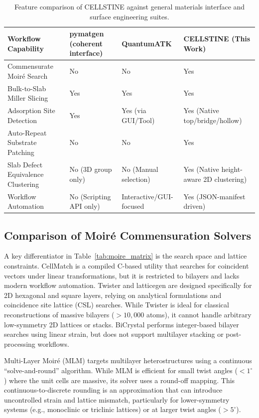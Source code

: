\documentclass[9pt,a4paper,twoside]{tau-class/tau}
\begin{document}
\begin{table}[!t]
    \centering
    \caption{Feature comparison of CELLSTINE against general materials interface and surface engineering suites.}
    \label{tab:interface_matrix}
    \small
    \begin{tabularx}{\textwidth}{@{}lXXX@{}}
        \toprule
        \textbf{Workflow Capability} & \textbf{pymatgen} (coherent interface) \cite{pymatgen,zur1984systematic} & \textbf{QuantumATK} \cite{quantumatk} & \textbf{CELLSTINE} (This Work) \\
        \midrule
        Commensurate Moir\'e Search & No & No & Yes \\
        Bulk-to-Slab Miller Slicing & Yes & Yes & Yes \\
        Adsorption Site Detection & Yes & Yes (via GUI/Tool) & Yes (Native top/bridge/hollow) \\
        Auto-Repeat Substrate Patching & No & No & Yes \\
        Slab Defect Equivalence Clustering & No (3D group only) & No (Manual selection) & Yes (Native height-aware 2D clustering) \\
        Workflow Automation & No (Scripting API only) & Interactive/GUI-focused & Yes (JSON-manifest driven) \\
        \bottomrule
    \end{tabularx}
\end{table}

\subsection{Comparison of Moir\'e Commensuration Solvers}
A key differentiator in Table~\ref{tab:moire_matrix} is the search space and lattice constraints. CellMatch \cite{cellmatch} is a compiled C-based utility that searches for coincident vectors under linear transformations, but it is restricted to bilayers and lacks modern workflow automation. Twister \cite{twister} and latticegen \cite{latticegen} are designed specifically for 2D hexagonal and square layers, relying on analytical formulations and coincidence site lattice (CSL) searches. While Twister is ideal for classical reconstructions of massive bilayers ($>10,000$ atoms), it cannot handle arbitrary low-symmetry 2D lattices or stacks. BiCrystal \cite{bicrystal} performs integer-based bilayer searches using linear strain, but does not support multilayer stacking or post-processing workflows.

Multi-Layer Moir\'e (MLM) \cite{mlm} targets multilayer heterostructures using a continuous ``solve-and-round'' algorithm. While MLM is efficient for small twist angles ($< 1^\circ$) where the unit cells are massive, its solver uses a round-off mapping. This continuous-to-discrete rounding is an approximation that can introduce uncontrolled strain and lattice mismatch, particularly for lower-symmetry systems (e.g., monoclinic or triclinic lattices) or at larger twist angles ($> 5^\circ$). 
\end{document}
